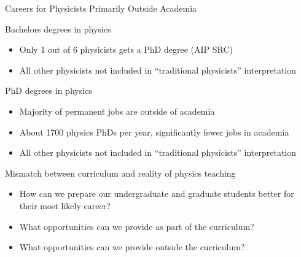 \documentclass[xcolor=table,compress,professionalfonts,pdfpagelabels]{beamer}
\begin{document}
\begin{frame}{Careers for Physicists Primarily Outside Academia}
 \begin{block}{Bachelors degrees in physics}
  \begin{itemize}
   \item Only 1 out of 6 physicists gets a PhD degree (AIP SRC)
   \item All other physicists not included in ``traditional physicists'' interpretation
  \end{itemize}
 \end{block}
 \begin{block}{PhD degrees in physics}
  \begin{itemize}
   \item Majority of permanent jobs are outside of academia
   \item About 1700 physics PhDs per year, significantly fewer jobs in academia
   \item All other physicists not included in ``traditional physicists'' interpretation
  \end{itemize}
 \end{block}
 \begin{block}{Mismatch between curriculum and reality of physics teaching}
  \begin{itemize}
   \item How can we prepare our undergraduate and graduate students better for their most likely career?
   \item What opportunities can we provide as part of the curriculum?
   \item What opportunities can we provide outside the curriculum?
  \end{itemize}
 \end{block}
\end{frame}
\end{document}
